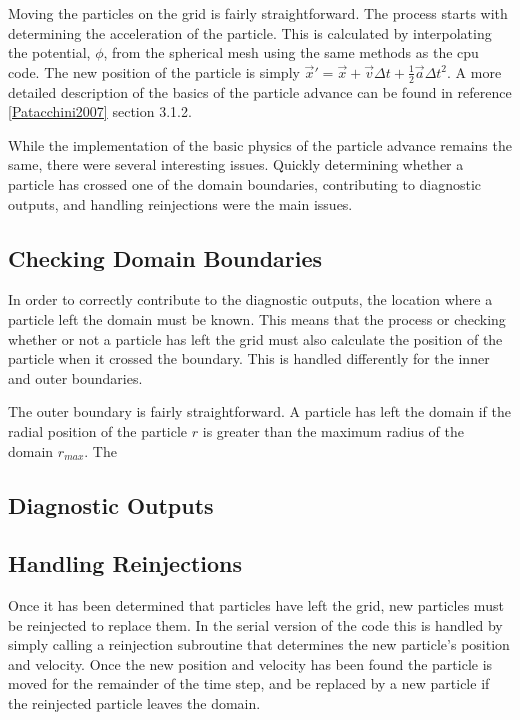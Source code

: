 Moving the particles on the grid is fairly straightforward. The process starts with determining the acceleration of the particle. This is calculated by interpolating the potential, $\phi$, from the spherical mesh using the same methods as the cpu code. The new position of the particle is simply $\vec{x}' = \vec{x}+\vec{v}\Delta t+\frac{1}{2}\vec{a}\Delta t^2$. A more detailed description of the basics of the particle advance can be found in reference \ref{Patacchini2007} section 3.1.2.
		
While the implementation of the basic physics of the particle advance remains the same, there were several interesting issues. Quickly determining whether a particle has crossed one of the domain boundaries, contributing to diagnostic outputs, and handling reinjections were the main issues. 

		\subsection{Checking Domain Boundaries}
In order to correctly contribute to the diagnostic outputs, the location where a particle left the domain must be known. This means that the process or checking whether or not a particle has left the grid must also calculate the position of the particle when it crossed the boundary. This is handled differently for the inner and outer boundaries. 

The outer boundary is fairly straightforward. A particle has left the domain if the radial position of the particle $r$ is greater than the maximum radius of the domain $r_{max}$. The 

		\subsection{Diagnostic Outputs}
		\subsection{Handling Reinjections}
Once it has been determined that particles have left the grid, new particles must be reinjected to replace them. In the serial version of the code this is handled by simply calling a reinjection subroutine that determines the new particle's position and velocity. Once the new position and velocity has been found the particle is moved for the remainder of the time step, and be replaced by a new particle if the reinjected particle leaves the domain.  

